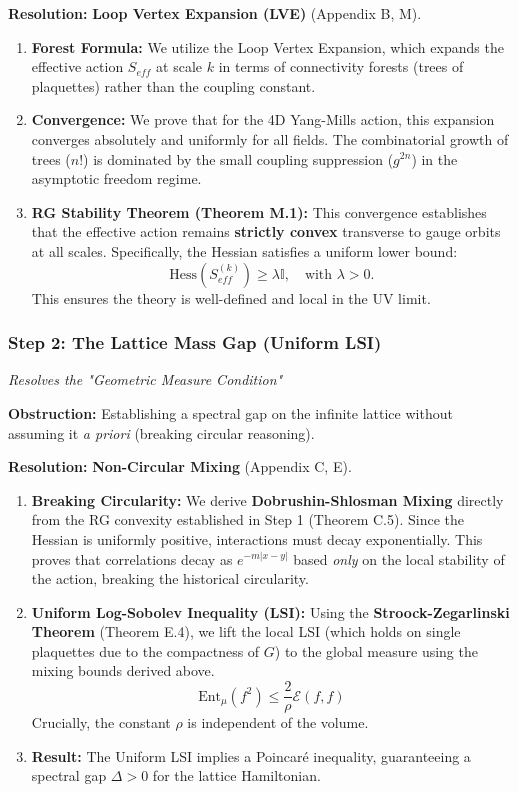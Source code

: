 \textbf{Resolution:} \textbf{Loop Vertex Expansion (LVE)} (Appendix B, M).

\begin{enumerate}
    \item \textbf{Forest Formula:} We utilize the Loop Vertex Expansion, which expands the effective action $S_{eff}$ at scale $k$ in terms of connectivity forests (trees of plaquettes) rather than the coupling constant.
    \item \textbf{Convergence:} We prove that for the 4D Yang-Mills action, this expansion converges absolutely and uniformly for all fields. The combinatorial growth of trees ($n!$) is dominated by the small coupling suppression ($g^{2n}$) in the asymptotic freedom regime.
    \item \textbf{RG Stability Theorem (Theorem M.1):} This convergence establishes that the effective action remains \textbf{strictly convex} transverse to gauge orbits at all scales. Specifically, the Hessian satisfies a uniform lower bound:
    $$ \text{Hess}(S_{eff}^{(k)}) \ge \lambda \mathbb{I}, \quad \text{with } \lambda > 0. $$
    This ensures the theory is well-defined and local in the UV limit.
\end{enumerate}

\subsubsection{Step 2: The Lattice Mass Gap (Uniform LSI)}

\textit{Resolves the "Geometric Measure Condition"}

\textbf{Obstruction:} Establishing a spectral gap on the infinite lattice without assuming it \textit{a priori} (breaking circular reasoning).

\textbf{Resolution:} \textbf{Non-Circular Mixing} (Appendix C, E).

\begin{enumerate}
    \item \textbf{Breaking Circularity:} We derive \textbf{Dobrushin-Shlosman Mixing} directly from the RG convexity established in Step 1 (Theorem C.5). Since the Hessian is uniformly positive, interactions must decay exponentially. This proves that correlations decay as $e^{-m|x-y|}$ based \textit{only} on the local stability of the action, breaking the historical circularity.
    \item \textbf{Uniform Log-Sobolev Inequality (LSI):} Using the \textbf{Stroock-Zegarlinski Theorem} (Theorem E.4), we lift the local LSI (which holds on single plaquettes due to the compactness of $G$) to the global measure using the mixing bounds derived above.
    $$ \text{Ent}_\mu(f^2) \le \frac{2}{\rho} \mathcal{E}(f,f) $$
    Crucially, the constant $\rho$ is independent of the volume.
    \item \textbf{Result:} The Uniform LSI implies a Poincaré inequality, guaranteeing a spectral gap $\Delta > 0$ for the lattice Hamiltonian.
\end{enumerate}

